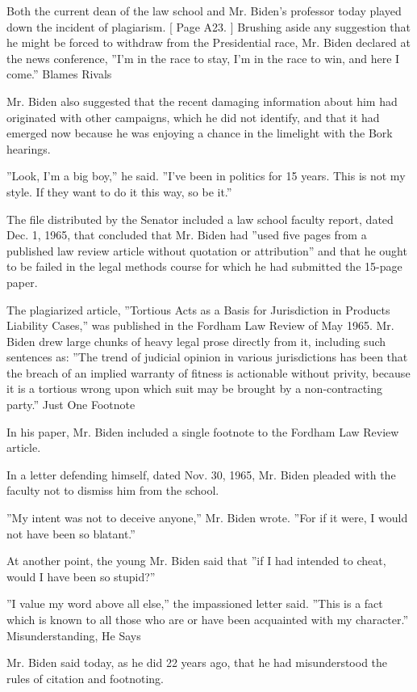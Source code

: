 Both the current dean of the law school and Mr. Biden's professor today
played down the incident of plagiarism. {[} Page A23. {]} Brushing aside
any suggestion that he might be forced to withdraw from the Presidential
race, Mr. Biden declared at the news conference, ''I'm in the race to
stay, I'm in the race to win, and here I come.'' Blames Rivals

Mr. Biden also suggested that the recent damaging information about him
had originated with other campaigns, which he did not identify, and that
it had emerged now because he was enjoying a chance in the limelight
with the Bork hearings.

''Look, I'm a big boy,'' he said. ''I've been in politics for 15 years.
This is not my style. If they want to do it this way, so be it.''

The file distributed by the Senator included a law school faculty
report, dated Dec. 1, 1965, that concluded that Mr. Biden had ''used
five pages from a published law review article without quotation or
attribution'' and that he ought to be failed in the legal methods course
for which he had submitted the 15-page paper.

The plagiarized article, ''Tortious Acts as a Basis for Jurisdiction in
Products Liability Cases,'' was published in the Fordham Law Review of
May 1965. Mr. Biden drew large chunks of heavy legal prose directly from
it, including such sentences as: ''The trend of judicial opinion in
various jurisdictions has been that the breach of an implied warranty of
fitness is actionable without privity, because it is a tortious wrong
upon which suit may be brought by a non-contracting party.'' Just One
Footnote

In his paper, Mr. Biden included a single footnote to the Fordham Law
Review article.

In a letter defending himself, dated Nov. 30, 1965, Mr. Biden pleaded
with the faculty not to dismiss him from the school.

''My intent was not to deceive anyone,'' Mr. Biden wrote. ''For if it
were, I would not have been so blatant.''

At another point, the young Mr. Biden said that ''if I had intended to
cheat, would I have been so stupid?''

''I value my word above all else,'' the impassioned letter said. ''This
is a fact which is known to all those who are or have been acquainted
with my character.'' Misunderstanding, He Says

Mr. Biden said today, as he did 22 years ago, that he had misunderstood
the rules of citation and footnoting.

